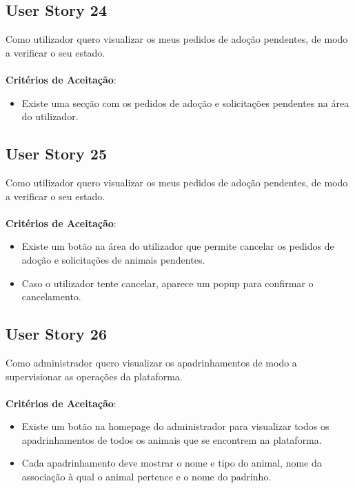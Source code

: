 \documentclass[a4paper,11pt]{article}
\begin{document}
\subsection{User Story 24}
Como utilizador quero visualizar os meus pedidos de adoção pendentes, de modo a verificar o seu estado.\\\\
\textbf{Critérios de Aceitação}:
\begin{itemize}
  \item Existe uma secção com os pedidos de adoção e solicitações pendentes na área do utilizador.
\end{itemize}

\subsection{User Story 25}
Como utilizador quero visualizar os meus pedidos de adoção pendentes, de modo a verificar o seu estado.\\\\
\textbf{Critérios de Aceitação}:
\begin{itemize}
  \item Existe um botão na área do utilizador que permite cancelar os pedidos de adoção e solicitações de animais pendentes.
  \item Caso o utilizador tente cancelar, aparece um popup para confirmar o cancelamento.
\end{itemize}

\subsection{User Story 26}
Como administrador quero visualizar os apadrinhamentos de modo a supervisionar as operações da plataforma.\\\\
\textbf{Critérios de Aceitação}:
\begin{itemize}
  \item Existe um botão na homepage do administrador para visualizar todos os apadrinhamentos de todos os animais que se encontrem na plataforma.
  \item Cada apadrinhamento deve mostrar o nome e tipo do animal, nome da associação à qual o animal pertence e o nome do padrinho.
\end{itemize}
\end{document}
